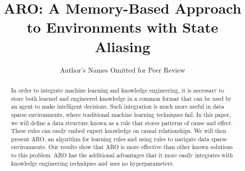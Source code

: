 \documentclass[letterpaper]{article} %
\title{ARO:  A Memory-Based Approach to Environments with State Aliasing }
\author{Author's Names Omitted for Peer Review
}
\begin{document}
\maketitle

\begin{abstract}

In order to integrate machine learning and knowledge engineering, it is necessary
to store both learned and engineered knowledge in a common format that can be used
by an agent to make intelligent decisions. Such integration is much more useful in data sparse environments, where traditional machine learning techniques fail.
In this paper, we will define a data structure known as a rule that stores patterns of cause and effect. These rules can easily embed expert knowledge on causal relationships. We will then present ARO, an algorithm for learning rules and using rules to navigate data sparse environments. Our results show that ARO is more effective than other known solutions to this problem. ARO has the additional advantages that it more easily integrates with knowledge engineering techniques and uses no hyperparameters.

\end{abstract}

\noindent

\end{document}
